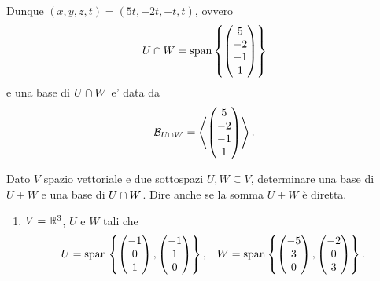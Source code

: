 \begin{example}
    Dunque $(x, y, z, t) = (5t, -2t, -t, t)$, ovvero \[
        U \cap W = \operatorname{span}\left\{\begin{pmatrix} 5\\-2\\-1\\1 \end{pmatrix}\right\}    
    \] e una base di $U \cap W$ e' data da \[
        \mathcal{B}_{U\cap W} = \left\langle \begin{pmatrix} 5\\-2\\-1\\1 \end{pmatrix} \right\rangle.
    \]
\end{example}

\begin{exercise}
    Dato $V$ spazio vettoriale e due sottospazi $U, W \subseteq V$, determinare una base di $U + W$ e una base di $U \cap W$. Dire anche se la somma $U + W$ è diretta.

    \begin{enumerate}
        \item $V = \mathbb{R}^3$, $U$ e $W$ tali che \begin{align*}
            U = \operatorname{span}\left\{\begin{pmatrix} -1\\0\\1 \end{pmatrix}, \begin{pmatrix} -1\\1\\0 \end{pmatrix}\right\}, &&W = \operatorname{span}\left\{\begin{pmatrix} -5\\3\\0 \end{pmatrix}, \begin{pmatrix} -2\\0\\3 \end{pmatrix}\right\}.
        \end{align*}
    \end{enumerate}
\end{exercise}
